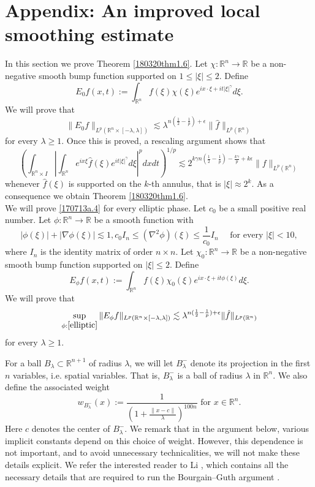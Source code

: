 \documentclass[12pt,leqno]{amsart}
\def\R{\mathbb{R}}
\def\beq{\begin{equation}}
\def\endeq{\end{equation}}
\def\lesim{\lesssim}
\theoremstyle{plain}
\numberwithin{equation}{section}
\begin{document}
\section{Appendix: An improved local smoothing estimate}\label{180320section8}



In this section we prove Theorem \ref{180320thm1.6}.
Let $\chi: \R^n\to \R$ be a non-negative smooth bump function supported on $1\le |\xi|\le 2$. Define 
\[
E_0 f(x, t):=\int_{\R^n} f(\xi)\chi(\xi) e^{ix\cdot \xi+it|\xi|^{\gamma}} d\xi.
\]
We will prove that
\beq\label{170713a.4}
\|E_0 f\|_{L^p(\R^n\times [-\lambda, \lambda])} \lesim \lambda^{n(\frac{1}{2}-\frac{1}{p})+\epsilon} \|\hat{f}\|_{L^p(\R^n)}
\endeq
for every $\lambda\ge 1$. Once this is proved, a rescaling argument shows that 
\beq\label{170713a.2}
\left(\int_{\R^n\times I} \left| \int_{\R^n}e^{ix\xi}\hat{f}(\xi)e^{it|\xi|^{\gamma}} d\xi\right|^p dxdt\right)^{1/p} \lesim 2^{k\gamma n(\frac{1}{2}-\frac{1}{p})-\frac{k\gamma }{p}+k\epsilon}\|f\|_{L^{p}(\R^n)}
\endeq
whenever $\hat{f}(\xi)$ is supported on the $k$-th annulus, that is $|\xi|\approx 2^k$. As a consequence we obtain Theorem \ref{180320thm1.6}.\\

We will prove \eqref{170713a.4} for every elliptic phase. Let $c_0$ be a small positive real number. 
Let $\phi: \R^n\to \R$ be a smooth function with 
\beq\label{elliptic}
|\phi(\xi)|+|\nabla \phi(\xi)|\lesim 1, c_0 I_n \le (\nabla^2 \phi)(\xi)\le \frac{1}{c_0} I_n \quad \text{ for every } |\xi|<10,
\endeq 
where $I_n$ is the identity matrix of order $n\times n$. Let $\chi_0: \R^n\to \R$ be a non-negative smooth bump function supported on $|\xi|\le 2$. Define 
\[
E_{\phi} f(x, t):=\int_{\R^n} f(\xi)\chi_0(\xi) e^{ix\cdot \xi+it\phi(\xi)} d\xi.
\]
We will prove that
\beq\label{170713a.4-a}
\sup_{\phi: \eqref{elliptic}}\|E_{\phi} f\|_{L^p(\R^n\times [-\lambda, \lambda])} \lesim \lambda^{n(\frac{1}{2}-\frac{1}{p})+\epsilon} \|\hat{f}\|_{L^p(\R^n)}
\endeq
for every $\lambda\ge 1$. 

For a ball $B_{\lambda}\subset \R^{n+1}$ of radius $\lambda$, we will let $B_{\lambda}^-$ denote its projection in the first $n$ variables, i.e. spatial variables. That is, $B_{\lambda}^-$ is a ball of radius $\lambda$ in $\R^n$. We also define the associated weight 
\[
w_{B_{\lambda}^-}(x):=\frac{1}{(1+\frac{\|x-c\|}{\lambda})^{100n}} \text{ for } x\in \R^n.
\]
Here $c$ denotes the center of $B_{\lambda}^-$. We remark that in the argument below, various implicit constants depend on this choice of weight. However, this dependence is not important, and to avoid unnecessary technicalities, we will not make these details explicit. We refer the interested reader to Li \cite{Li17}, which contains all the necessary details that are required to run the Bourgain--Guth argument \cite{MR2860188}. \\
\end{document}

